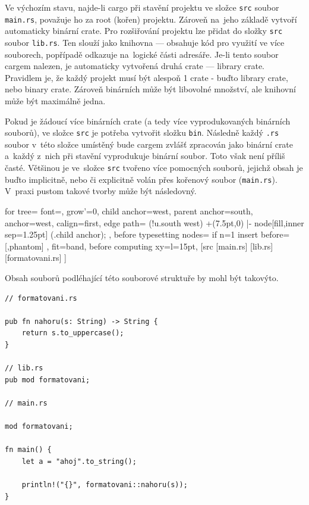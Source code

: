 \documentclass[a4paper, 12pt, twoside]{article} %
\newcommand{\rust}[1]{\texttt{#1}}
\begin{document}
		Ve výchozím stavu, najde-li cargo při stavění projektu ve složce \texttt{src} soubor \texttt{main.rs}, považuje ho za root (kořen) projektu. Zároveň na~jeho základě vytvoří automaticky binární crate. Pro rozšiřování projektu lze přidat do složky \texttt{src} soubor \rust{lib.rs}. Ten slouží jako knihovna — obsahuje kód pro využití ve více souborech, popřípadě odkazuje na~logické části adresáře. Je-li tento soubor cargem nalezen, je automaticky vytvořená druhá crate — library crate. Pravidlem je, že každý projekt musí být alespoň 1 crate - buďto library crate, nebo binary crate. Zároveň binárních může být libovolné množství, ale knihovní může být maximálně jedna.
		
		Pokud je žádoucí více binárních crate (a tedy více vyprodukovaných binárních souborů), ve složce \texttt{src} je potřeba vytvořit složku \texttt{bin}. Následně každý \texttt{.rs} soubor v~této složce umístěný bude cargem zvlášť zpracován jako binární crate a~každý z~nich při stavění vyprodukuje binární soubor. Toto však není příliš časté. Většinou je ve~složce \texttt{src} tvořeno více pomocných souborů, jejichž obsah je buďto implicitně, nebo či explicitně volán přes kořenový soubor (\texttt{main.rs}). V~praxi pustom takové tvorby může být následovný.
		\begin{center}
			\begin{forest}
				for tree={
				font=\ttfamily,
				grow'=0,
				child anchor=west,
				parent anchor=south,
				anchor=west,
				calign=first,
				edge path={
					\noexpand{}
					(!u.south west) +(7.5pt,0) |- node[fill,inner sep=1.25pt] {} (.child anchor);
				},
				before typesetting nodes={
					if n=1
					{insert before={[,phantom]}}
					{}
				},
				fit=band,
				before computing xy={l=15pt},
				}
			[src
				[main.rs]
				[lib.rs]
				[formatovani.rs]
			]
			\end{forest}
		\end{center}
		
		Obsah souborů podléhající této souborové struktuře by mohl být takovýto.
		\begin{verbatim}
// formatovani.rs

pub fn nahoru(s: String) -> String {
	return s.to_uppercase();
}

// lib.rs
pub mod formatovani;

// main.rs

mod formatovani;

fn main() {
	let a = "ahoj".to_string();
	
	println!("{}", formatovani::nahoru(s));
}
		\end{verbatim}
\end{document}
